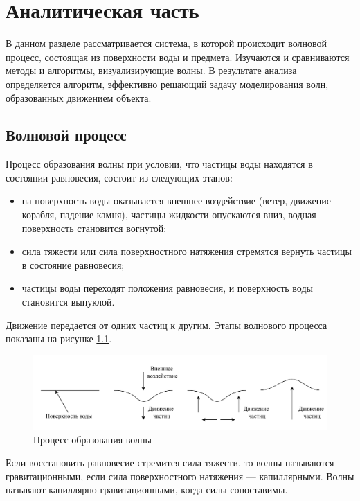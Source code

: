 \chapter{Аналитическая часть}

В данном разделе рассматривается система, в которой происходит волновой процесс, состоящая из поверхности воды и предмета. Изучаются и сравниваются методы и алгоритмы, визуализирующие волны. В результате анализа определяется алгоритм, эффективно решающий задачу моделирования волн, образованных движением объекта.

\section{Волновой процесс}

Процесс образования волны \cite{airy} при условии, что частицы воды находятся в состоянии равновесия, состоит из следующих этапов:

\begin{itemize}
	\item на поверхность воды оказывается внешнее воздействие (ветер, движение корабля, падение камня), частицы жидкости опускаются вниз, водная поверхность становится вогнутой;
	\item сила тяжести или сила поверхностного натяжения стремятся вернуть частицы в состояние равновесия;
	\item частицы воды переходят положения равновесия, и поверхность воды становится выпуклой.
\end{itemize}

Движение передается от одних частиц к другим. Этапы волнового процесса показаны на рисунке \ref{img:wave-process}.

\begin{figure}[H]
	\begin{center}
		\includegraphics[scale=0.8]{img/wave-process.pdf}
	\end{center}
	\captionsetup{justification=centering}
	\caption{Процесс образования волны}
	\label{img:wave-process}
\end{figure}

Если восстановить равновесие стремится сила тяжести, то волны называются гравитационными, если сила поверхностного натяжения --- капиллярными. Волны называют капиллярно-гравитационными, когда силы сопоставимы.

